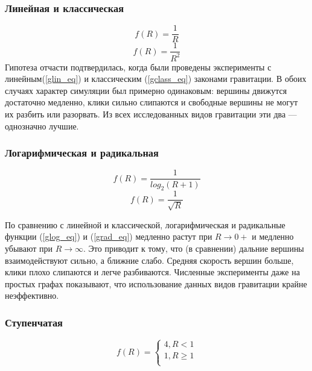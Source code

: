     \subsubsection{Линейная и классическая}
    \begin{equation}
    \label{glin_eq}
      f(R) = \frac{1}{R}
    \end{equation}
    \begin{equation}
    \label{gclass_eq}
      f(R) = \frac{1}{R^2}
    \end{equation}
    Гипотеза отчасти подтвердилась, когда были проведены эксперименты с
    линейным\footnotemark (\ref{glin_eq}) и классическим (\ref{gclass_eq})
    законами гравитации. 
    В обоих случаях характер симуляции был примерно одинаковым: вершины движутся
    достаточно медленно, клики сильно слипаются и свободные вершины не могут их 
    разбить или разорвать.
    Из всех исследованных видов гравитации эти два --- однозначно лучшие.

    \subsubsection{Логарифмическая и радикальная}
    \begin{equation}
    \label{glog_eq}
      f(R) = \frac{1}{log_2\left(R + 1 \right)}
    \end{equation}
    \begin{equation}\label{grad_eq}
      f(R) = \frac{1}{\sqrt{R}}
    \end{equation}

    По сравнению с линейной и классической, логарифмическая и радикальные функции
    (\ref{glog_eq}) и (\ref{grad_eq}) медленно растут при $R \rightarrow 0+$ и
    медленно убывают при $R \rightarrow \infty$.
    Это приводит к тому, что (в сравнении) дальние вершины взаимодействуют сильно,
    а ближние слабо. Средняя скорость вершин больше, клики плохо слипаются и легче
    разбиваются.
    Численные эксперименты даже на простых графах показывают, что использование
    данных видов гравитации крайне неэффективно.

    \subsubsection{Ступенчатая}
    \begin{equation}
    \label{gstep_eq}
      f(R) =
      \begin{cases}
        4, R < 1 \\
        1, R \geqslant 1 \\
      \end{cases}
    \end{equation}


